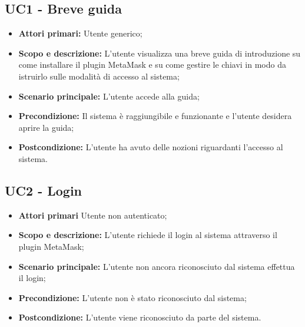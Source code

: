 \documentclass[AnalisiDeiRequisiti.tex]{subfiles}
\begin{document}
\subsection{UC1 - Breve guida}
\begin{itemize}
	\item \textbf{Attori primari:} Utente generico;\\
	\item \textbf{Scopo e descrizione:} L'utente visualizza una breve guida di introduzione su come installare il plugin MetaMask e su come gestire le chiavi in modo da istruirlo sulle modalità di accesso al sistema;\\
	\item \textbf{Scenario principale:} L'utente accede alla guida;\\
	\item \textbf{Precondizione:} Il sistema è raggiungibile e funzionante e l'utente desidera aprire la guida;\\
	\item \textbf{Postcondizione:} L'utente ha avuto delle nozioni riguardanti l'accesso al sistema.\\
\end{itemize}
\subsection{UC2 - Login}
\begin{itemize}
	\item \textbf{Attori primari} Utente non autenticato;\\
	\item \textbf{Scopo e descrizione:} L'utente richiede il login al sistema attraverso il plugin MetaMask;\\
	\item \textbf{Scenario principale:} L'utente non ancora riconosciuto dal sistema effettua il login;\\
	\item \textbf{Precondizione:} L'utente non è stato riconosciuto dal sistema;\\
	\item \textbf{Postcondizione:} L'utente viene riconosciuto da parte del sistema.\\
\end{itemize}
\end{document}
